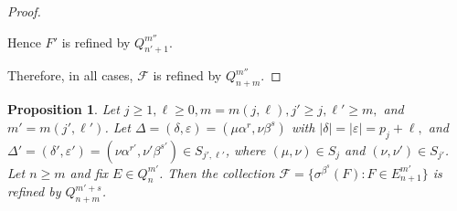 \documentclass[12pt]{amsart}
\newcommand{\mc}[1]{\mathcal{#1}}
\newcommand{\al}{\alpha}
\newcommand{\be}{\beta}
\newcommand{\de}{\delta}
\newcommand{\De}{\Delta}
\newcommand{\ep}{\varepsilon}
\newcommand{\si}{\sigma}
\theoremstyle{plain} %
\newtheorem{Proposition}[Theorem]{Proposition}
\theoremstyle{definition} %
\begin{document}
\begin{proof}
\begin{enumerate}
        Hence $F'$ is refined by $Q_{n'+1}^{m''}$.
    \end{enumerate}
    Therefore, in all cases, $\mc{F}$ is refined by $Q_{n+m}^{m''}$.
\end{proof}

\begin{Proposition}
    \label{prop F is refined by (c=alpha)}
    Let $j \geq 1, \ell \geq 0, m = m(j,\ell), j' \geq j, \ell' \ge m,$ and $m' = m(j', \ell')$. Let $\De = (\de, \ep) =(\mu\al^r, \nu\be^s) $ with $|\de| = |\ep| = p_j + \ell,$ and $\De' = (\de', \ep') = (\nu\al^{r'}, \nu' \be^{s'}) \in S_{j',\ell'}$, where $(\mu, \nu) \in S_j$ and $(\nu, \nu') \in S_{j'}$. Let $n \geq m$ and fix $E \in Q_n^{m'}$.  Then the collection $\mc{F} = \{\si^{\be^s}(F) : F \in E_{n+1}^{m'} \}$ is refined by $Q_{n+m}^{m'+s}$.
\end{Proposition}
\end{document}
